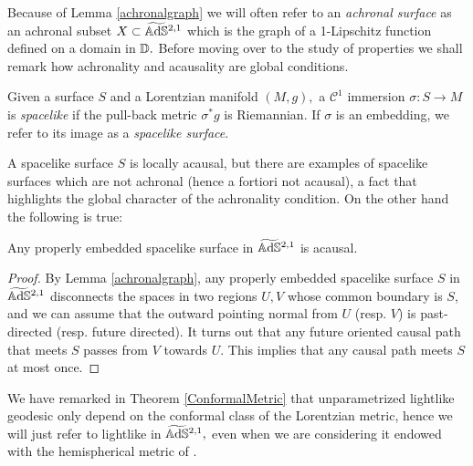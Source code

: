 Because of Lemma \ref{achronalgraph} we will often refer to an \textit{achronal surface} as an achronal subset $X\subset\widetilde{\mathbb{A}\mathrm{d}\mathbb{S}}{}^{2,1}$ which is the graph of a 1-Lipschitz function defined on a domain in $\mathbb{D}.$ Before moving over to the study of properties we shall remark how achronality and acausality are global conditions. 

\begin{definition} Given a surface $S$ and a Lorentzian manifold $(M,g),$ a $\mathcal{C}^1$ immersion $\sigma:S\to M$ is \textit{spacelike} if the pull-back metric $\sigma^*g$ is Riemannian. If $\sigma$ is an embedding, we refer to its image as a \textit{spacelike surface}.
\end{definition}

A spacelike surface $S$ is locally acausal, but there are examples of spacelike surfaces which are not achronal (hence a fortiori not acausal), a fact that highlights the global character of the achronality condition. On the other hand the following is true: 

\begin{lemma}\label{415}
    Any properly embedded spacelike surface in $\widetilde{\mathbb{A}\mathrm{d}\mathbb{S}}{}^{2,1}$ is acausal. 
\end{lemma}
\begin{proof}
    By Lemma \ref{achronalgraph}, any properly embedded spacelike surface $S$ in $\widetilde{\mathbb{A}\mathrm{d}\mathbb{S}}{}^{2,1}$ disconnects the spaces in two regions $U,V$ whose common boundary is $S$, and we can assume that the outward pointing normal from $U$ (resp. $V$) is past-directed (resp. future directed). It turns out that any future oriented causal path that meets $S$ passes from $V$ towards $U$. This implies that any causal path meets $S$ at most once.
\end{proof}

We have remarked in Theorem \ref{ConformalMetric} that unparametrized lightlike geodesic only depend on the conformal class of the Lorentzian metric, hence we will just refer to lightlike in $\widetilde{\mathbb{A}\mathrm{d}\mathbb{S}}{}^{2,1},$ even when we are considering it endowed with the hemispherical metric of . 


